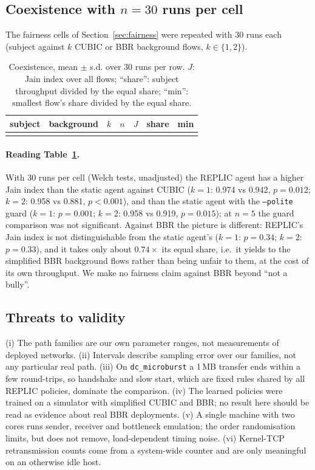 \subsection{Coexistence with $n=30$ runs per cell}
\label{sec:fairness30}
The fairness cells of Section~\ref{sec:fairness} were repeated with 30 runs each (subject against $k$ CUBIC or BBR background flows, $k\in\{1,2\}$).
\begin{table}[t]\centering\footnotesize
\caption{Coexistence, mean $\pm$ s.d. over 30 runs per row. $J$: Jain index over all flows; ``share'': subject throughput divided by the equal share; ``min'': smallest flow's share divided by the equal share.}
\label{tab:fair30}
\begin{tabular}{@{}llrrrrr@{}}\toprule
subject & background & $k$ & $n$ & $J$ & share & min\\\midrule
\\
\bottomrule\end{tabular}
\end{table}

\paragraph{Reading Table~\ref{tab:fair30}.} With 30 runs per cell (Welch tests, unadjusted) the REPLIC agent has a higher Jain index than the static agent against CUBIC
($k=1$: 0.974 vs 0.942, $p=0.012$; $k=2$: 0.958 vs 0.881, $p<0.001$), and than the static agent with the \texttt{--polite} guard ($k=1$: $p=0.001$; $k=2$: 0.958 vs 0.919, $p=0.015$);
at $n=5$ the guard comparison was not significant. Against BBR the picture is different: REPLIC's Jain index is not distinguishable from the static agent's
($k=1$: $p=0.34$; $k=2$: $p=0.33$), and it takes only about $0.74\times$ its equal share, i.e.\ it yields to the simplified BBR background flows rather than being unfair to them,
at the cost of its own throughput. We make no fairness claim against BBR beyond ``not a bully''.

\subsection{Threats to validity}
(i) The path families are our own parameter ranges, not measurements of deployed networks. (ii) Intervals describe sampling error over our families, not any particular real path.
(iii) On \texttt{dc\_microburst} a 1\,MB transfer ends within a few round-trips, so handshake and slow start, which are fixed rules shared by all REPLIC policies, dominate
the comparison. (iv) The learned policies were trained on a simulator with simplified CUBIC and BBR; no result here should be read as evidence about real BBR deployments.
(v) A single machine with two cores runs sender, receiver and bottleneck emulation; the order randomisation limits, but does not remove, load-dependent timing noise.
(vi) Kernel-TCP retransmission counts come from a system-wide counter and are only meaningful on an otherwise idle host.
